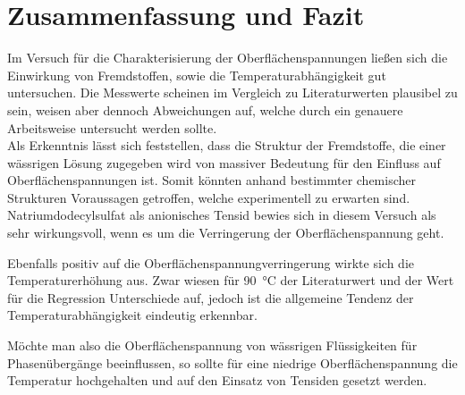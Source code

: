 \section{Zusammenfassung und Fazit}
\label{sec:zusammenfassung}

Im Versuch für die Charakterisierung der Oberflächenspannungen ließen sich die Einwirkung von Fremdstoffen, sowie die Temperaturabhängigkeit gut untersuchen. Die Messwerte scheinen im Vergleich zu Literaturwerten plausibel zu sein, weisen aber dennoch Abweichungen auf, welche durch ein genauere Arbeitsweise untersucht werden sollte.\\
Als Erkenntnis lässt sich feststellen, dass die Struktur der Fremdstoffe, die einer wässrigen Lösung zugegeben wird von massiver Bedeutung für den Einfluss auf Oberflächenspannungen ist. Somit könnten anhand bestimmter chemischer Strukturen Voraussagen getroffen, welche experimentell zu erwarten sind.
Natriumdodecylsulfat als anionisches Tensid bewies sich in diesem Versuch als sehr wirkungsvoll, wenn es um die Verringerung der Oberflächenspannung geht. 

Ebenfalls positiv auf die Oberflächenspannungverringerung wirkte sich die Temperaturerhöhung aus. Zwar wiesen für \SI{90}{\celsius} der Literaturwert und der Wert für die Regression Unterschiede auf, jedoch ist die allgemeine Tendenz der Temperaturabhängigkeit eindeutig erkennbar.

Möchte man also die Oberflächenspannung von wässrigen Flüssigkeiten für Phasenübergänge beeinflussen, so sollte für eine niedrige Oberflächenspannung die Temperatur hochgehalten und auf den Einsatz von Tensiden gesetzt werden.